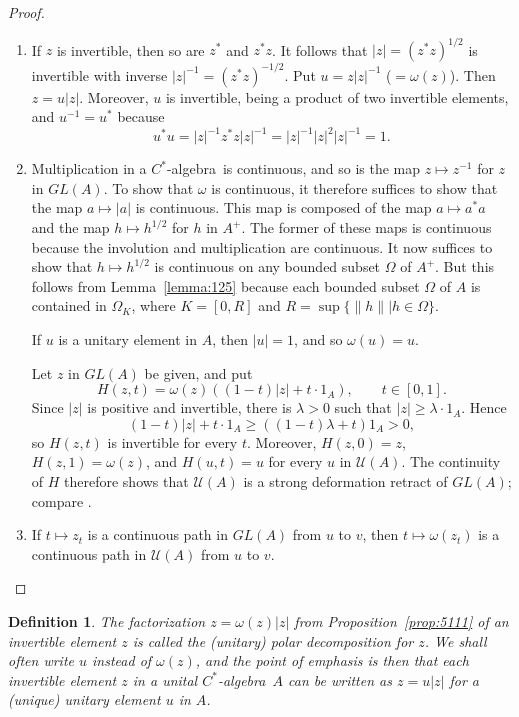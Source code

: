 \documentclass{book}
\newtheorem{definition}{Definition}[section]
\def\cstar{\(C^*\)-algebra}
\begin{document}
\begin{proof}
  \begin{enumerate}
    \item If \(z\) is invertible, then so are \(z^*\) and \(z^*z\). It follows that \(|z|={(z^*z)}^{1/2}\) is invertible
      with inverse \(|z|^{-1}=(z^*z)^{-1/2}\). Put \(u=z|z|^{-1}\) (\(=\omega(z)\)).
      Then \(z=u|z|\). Moreover, \(u\) is invertible, being a product of two invertible elements, and \(u^{-1}=u^*\) because
      \[u^*u=|z|^{-1}z^*z|z|^{-1}=|z|^{-1}|z|^2|z|^{-1}=1.\]
    \item Multiplication in a \cstar\ is continuous, and so is the map \(z\mapsto z^{-1}\) for \(z\) in \(GL(A)\).
      To show that \(\omega\) is continuous, it therefore suffices to show that the map \(a\mapsto |a|\) is continuous.
      This map is composed of the map \(a\mapsto a^*a\) and the map \(h\mapsto h^{1/2}\) for \(h\) in \(A^+\).
      The former of these maps is continuous because the involution and multiplication are continuous. It now suffices to show that \(h\mapsto h^{1/2}\)
      is continuous on any bounded subset \(\Omega\) of \(A^+\). But this follows from Lemma~\ref{lemma:125} 
      because each bounded subset \(\Omega\) of \(A\) is contained in \(\Omega_K\), where \(K=[0,R]\) and \(R=\sup\{\|h\||h\in\Omega\}\).\par 
      If \(u\) is a unitary element in \(A\), then \(|u|=1\), and so \(\omega(u)=u\).\par
      Let \(z\) in \(GL(A)\) be given, and put
      \[
        H(z,t)=\omega(z)((1-t)|z|+t\cdot 1_A),\qquad t\in[0,1].
      \]
      Since \(|z|\) is positive and invertible, there is \(\lambda>0\) such that \(|z|\geq\lambda\cdot 1_A\). Hence
      \[
        (1-t)|z|+t\cdot 1_A\geq ((1-t)\lambda+t)1_A>0,
      \]
      so \(H(z,t)\) is invertible for every \(t\). Moreover, \(H(z,0)=z\), \(H(z,1)=\omega(z)\), and
      \(H(u,t)=u\) for every \(u\) in \(\mathcal{U}(A)\). The continuity of \(H\) therefore shows that
      \(\mathcal{U}(A)\) is a strong deformation retract of \(GL(A)\); compare
      \cite[Section~2.1]{RordamLarsenLaustsen2000}.
    \item If \(t\mapsto z_t\) is a continuous path in \(GL(A)\) from \(u\) to \(v\), then \(t\mapsto \omega(z_t)\) is a continuous path in \(\mathcal{U}(A)\) from \(u\) to \(v\).
  \end{enumerate}
\end{proof}
\begin{definition}
  The factorization \(z=\omega(z)|z|\) from Proposition~\ref{prop:5111} of an invertible element \(z\) is called
  the \textnormal{(unitary) polar decomposition} for \(z\). We shall often write \(u\) instead of \(\omega(z)\), and the point
  of emphasis is then that each invertible element \(z\) in a unital \cstar\ \(A\) can be written as 
  \(z=u|z|\) for a (unique) unitary element \(u\) in \(A\).
\end{definition}
\end{document}
